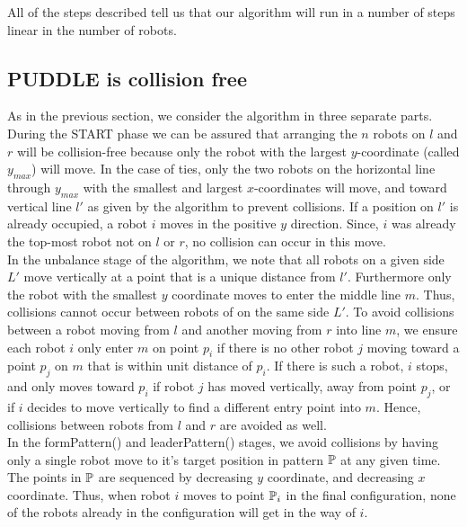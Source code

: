 \documentclass[preprint,10pt]{elsarticle}
\begin{document}
		All of the steps described tell us that our algorithm will run in a number of steps linear in the 
		number of robots.  


		\subsection{PUDDLE is collision free} 
		As in the previous section, we consider the algorithm in three separate parts. During the START phase
		we can be assured that arranging the $n$ robots on $l$ and $r$ will be collision-free because only the
		robot with the largest $y$-coordinate (called $y_{max}$) will move. In the case of ties, only the two robots
		on the horizontal line through $y_{max}$ with the smallest and largest $x$-coordinates will move, and toward
		vertical line $l'$ as given by the algorithm to prevent collisions. 
		If a position on $l'$ is already occupied, a robot $i$
		moves in the positive $y$ direction. Since, $i$ was already the top-most robot not on $l$ or $r$, no collision
		can occur in this move. \\

		In the unbalance stage of the algorithm, we note that all robots on a given side $L'$ move vertically at a point 
		that is a unique distance from $l'$. Furthermore only the robot with the smallest $y$ coordinate
		moves to enter the middle line $m$. Thus, collisions cannot occur between robots of on the same side $L'$.
		To avoid collisions between a robot moving from $l$ and another moving from $r$ into line $m$, we ensure each
		robot $i$ only enter $m$ on point $p_i$ if there is no other robot $j$ moving toward a point $p_j$ on $m$
		that is within unit distance of $p_i$. If there is such a robot, $i$ stops, and only moves toward $p_i$ if
		robot $j$ has moved vertically, away from point $p_j$, or if $i$ decides to move vertically to find a 
		different entry point into $m$. Hence, collisions between robots from $l$ and $r$ are avoided as well. \\

		In the formPattern() and leaderPattern() stages, we avoid collisions by having only a single robot move to
		it's target position in pattern $\mathbb{P}$ at any given time. The points in $\mathbb{P}$ are sequenced by 
		decreasing $y$ coordinate, and decreasing $x$ coordinate. Thus, when robot $i$ moves to point $\mathbb{P}_i$ in 
		the final configuration, none of the robots already in the configuration will get in the way of $i$. \\
\end{document}
